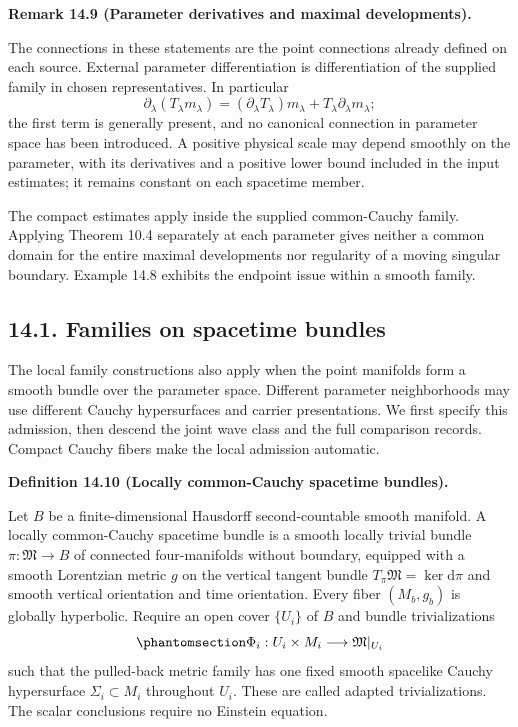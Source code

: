 \documentclass[
  english,
  11pt,
  reqno]{amsart}
\makeatletter
\newcommand{\pandocstatementheading}[1]{%
  \par\addpenalty{\@beginparpenalty}%
  \addvspace{.5\baselineskip plus .2\baselineskip minus .2\baselineskip}%
  {\normalfont\bfseries #1\par}%
  \nobreak\@afterindenttrue\@afterheading
}
\makeatother
\begin{document}
\pandocstatementheading{\protect{}\label{rem:parameter-family-scope}Remark 14.9 (Parameter derivatives and maximal developments).}

The connections in these statements are the point connections already
defined on each source. External parameter differentiation is
differentiation of the supplied family in chosen representatives. In
particular \[
\partial_\lambda(T_\lambda m_\lambda)
=(\partial_\lambda T_\lambda)m_\lambda
 +T_\lambda\partial_\lambda m_\lambda;
\] the first term is generally present, and no canonical connection in
parameter space has been introduced. A positive physical scale may
depend smoothly on the parameter, with its derivatives and a positive
lower bound included in the input estimates; it remains constant on each
spacetime member.

The compact estimates apply inside the supplied common-Cauchy family.
Applying Theorem 10.4 separately at each parameter gives neither a
common domain for the entire maximal developments nor regularity of a
moving singular boundary. Example 14.8 exhibits the endpoint issue
within a smooth family.

\protect{}\label{sec:intrinsic-spacetime-families}

\subsection{14.1. Families on spacetime
bundles}\label{families-on-spacetime-bundles}

The local family constructions also apply when the point manifolds form
a smooth bundle over the parameter space. Different parameter
neighborhoods may use different Cauchy hypersurfaces and carrier
presentations. We first specify this admission, then descend the joint
wave class and the full comparison records. Compact Cauchy fibers make
the local admission automatic.

\pandocstatementheading{\protect{}\label{def:locally-common-cauchy-bundles}Definition 14.10 (Locally common-Cauchy spacetime bundles).}

Let \(B\) be a finite-dimensional Hausdorff second-countable smooth
manifold. A locally common-Cauchy spacetime bundle is a smooth locally
trivial bundle \(\pi:\mathfrak M\to B\) of connected four-manifolds
without boundary, equipped with a smooth Lorentzian metric \(g\) on the
vertical tangent bundle \(T_\pi\mathfrak M=\ker\mathrm d\pi\) and smooth
vertical orientation and time orientation. Every fiber \((M_b,g_b)\) is
globally hyperbolic. Require an open cover \(\{U_i\}\) of \(B\) and
bundle trivializations
\begin{equation}\protect\phantomsection\label{eq:intrinsic-family-local-trivializations}{
\Phi_i:U_i\times M_i\longrightarrow\mathfrak M|_{U_i}
}\end{equation} such that the pulled-back metric family has one fixed
smooth spacelike Cauchy hypersurface \(\Sigma_i\subset M_i\) throughout
\(U_i\). These are called adapted trivializations. The scalar
conclusions require no Einstein equation.
\end{document}
